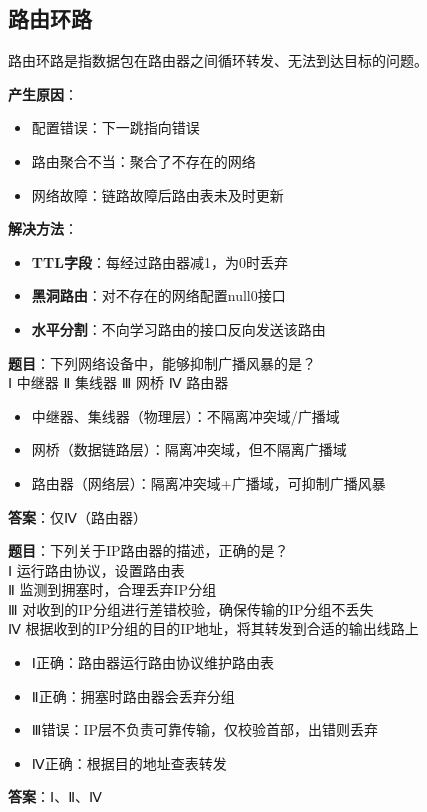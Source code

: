 \documentclass[12pt,a4paper,openany]{ctexbook}
\begin{document}
\subsection{路由环路}
路由环路是指数据包在路由器之间循环转发、无法到达目标的问题。

\textbf{产生原因}：
\begin{itemize}[leftmargin=2em,itemsep=0pt]
    \item 配置错误：下一跳指向错误
    \item 路由聚合不当：聚合了不存在的网络
    \item 网络故障：链路故障后路由表未及时更新
\end{itemize}

\textbf{解决方法}：
\begin{itemize}[leftmargin=2em,itemsep=0pt]
    \item \textbf{TTL字段}：每经过路由器减1，为0时丢弃
    \item \textbf{黑洞路由}：对不存在的网络配置null0接口
    \item \textbf{水平分割}：不向学习路由的接口反向发送该路由
\end{itemize}

\begin{examplebox}[例题4.8 网络设备与广播域]
\textbf{题目}：下列网络设备中，能够抑制广播风暴的是？\\
Ⅰ 中继器 \quad Ⅱ 集线器 \quad Ⅲ 网桥 \quad Ⅳ 路由器
\tcblower
\begin{itemize}[itemsep=0pt]
    \item 中继器、集线器（物理层）：不隔离冲突域/广播域
    \item 网桥（数据链路层）：隔离冲突域，但不隔离广播域
    \item 路由器（网络层）：隔离冲突域+广播域，可抑制广播风暴
\end{itemize}

\textbf{答案}：仅Ⅳ（路由器）
\end{examplebox}

\begin{examplebox}[例题4.9 IP路由器功能]
\textbf{题目}：下列关于IP路由器的描述，正确的是？\\
Ⅰ 运行路由协议，设置路由表\\
Ⅱ 监测到拥塞时，合理丢弃IP分组\\
Ⅲ 对收到的IP分组进行差错校验，确保传输的IP分组不丢失\\
Ⅳ 根据收到的IP分组的目的IP地址，将其转发到合适的输出线路上
\tcblower
\begin{itemize}[itemsep=0pt]
    \item Ⅰ正确：路由器运行路由协议维护路由表
    \item Ⅱ正确：拥塞时路由器会丢弃分组
    \item Ⅲ错误：IP层不负责可靠传输，仅校验首部，出错则丢弃
    \item Ⅳ正确：根据目的地址查表转发
\end{itemize}

\textbf{答案}：Ⅰ、Ⅱ、Ⅳ
\end{examplebox}
\end{document}
